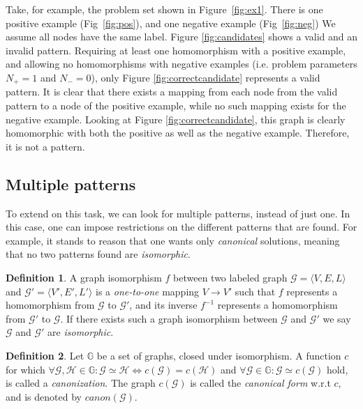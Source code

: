 \documentclass{article}
\theoremstyle{definition}
\newtheorem{definition}{Definition}[section]
\newcommand{\triple}[1]{\ensuremath{\langle #1 \rangle}}
\newcommand{\graph}[1]{\ensuremath{\mathcal{#1}}}
\newcommand{\graphset}[1]{\ensuremath{\mathbb{#1}}}
\begin{document}
Take, for example, the problem set shown in Figure~\ref{fig:ex1}.
There is one positive example (Fig~\ref{fig:pos}), and one negative example (Fig~\ref{fig:neg})
We assume all nodes have the same label.
Figure \ref{fig:candidates} shows a valid and an invalid pattern.
Requiring at least one homomorphism with a positive example, and allowing no homomorphisms with negative examples (i.e. problem parameters $N_{+}=1$ and $N_{-}=0$), only Figure \ref{fig:correctcandidate} represents a valid pattern.
It is clear that there exists a mapping from each node from the valid pattern to a node of the positive example, while no such mapping exists for the negative example.
Looking at Figure \ref{fig:correctcandidate}, this graph is clearly homomorphic with both the positive as well as the negative example. Therefore, it is not a pattern.

\subsection{Multiple patterns}
To extend on this task, we can look for multiple patterns, instead of just one.
In this case, one can impose restrictions on the different patterns that are found.
For example, it stands to reason that one wants only \emph{canonical} solutions, meaning that no two patterns found are \emph{isomorphic}.

\begin{definition}
\label{def:isomorphism}
A graph isomorphism $f$ between two labeled graph $\graph{G} = \triple{V,E,L}$ and $\graph{G'} = \triple{V',E',L'}$ is a \emph{one-to-one} mapping $V \rightarrow V'$ 
such that $f$ represents a homomorphism from $\graph{G}$ to $\graph{G'}$,
and its inverse $f^{-1}$ represents a homomorphism from $\graph{G'}$ to $\graph{G}$.
If there exists such a graph isomorphism between $\graph{G}$ and $\graph{G'}$ we say $\graph{G}$ and $\graph{G'}$ are \emph{isomorphic}.
\end{definition}


\begin{definition}
\label{def:canonicalForm}
Let $\graphset{G}$ be a set of graphs, closed under isomorphism.
A function $c$ for which $\forall \graph{G,H} \in \graphset{G} : \graph{G} \simeq \graph{H} \iff c(\graph{G}) = c(\graph{H})$ and $\forall \graph{G} \in \graphset{G} : \graph{G} \simeq c(\graph{G})$ hold, is called a \emph{canonization}.
The graph $c(\graph{G})$ is called the \emph{canonical form} w.r.t $c$, and is denoted by $\mathit{canon}(\graph{G})$.
\end{definition}
\end{document}
